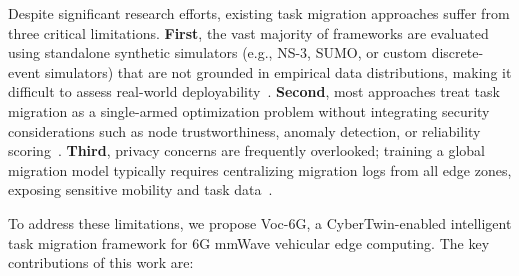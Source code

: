 \documentclass[journal,twoside]{IEEEtran}
\newcommand{\VocSixG}{Voc-6G}
\begin{document}
Despite significant research efforts, existing task migration approaches suffer from three critical limitations. \textbf{First}, the vast majority of frameworks are evaluated using standalone synthetic simulators (e.g., NS-3, SUMO, or custom discrete-event simulators) that are not grounded in empirical data distributions, making it difficult to assess real-world deployability~\cite{hou2018mobile, sun2021toward}. \textbf{Second}, most approaches treat task migration as a single-armed optimization problem without integrating security considerations such as node trustworthiness, anomaly detection, or reliability scoring~\cite{wang2020resource, chen2022intelligent}. \textbf{Third}, privacy concerns are frequently overlooked; training a global migration model typically requires centralizing migration logs from all edge zones, exposing sensitive mobility and task data~\cite{wang2020federated, lim2021federated}.

To address these limitations, we propose \VocSixG{}, a CyberTwin-enabled intelligent task migration framework for 6G mmWave vehicular edge computing. The key contributions of this work are:
\end{document}
